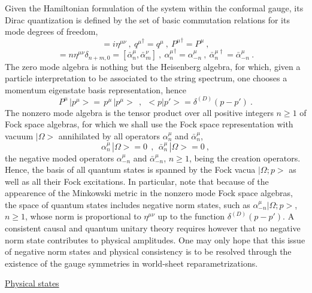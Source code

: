 \documentclass[a4paper,11pt]{article}
\begin{document}
Given the Hamiltonian formulation of the system within the conformal
gauge, its Dirac quantization is defined by the set of basic commutation
relations for its mode degrees of freedom,
\begin{equation}
[\sqrt{2\alpha'}q^\mu,P^\nu]=i\eta^{\mu\nu}\ ,\ {q^\mu}^\dagger=q^\mu\ ,\
{P^\mu}^\dagger=P^\mu\ ,
\end{equation}
\begin{equation}
[\alpha^\mu_n,\alpha^\nu_m]=n\eta^{\mu\nu}\delta_{n+m,0}=
[\bar{\alpha}^\mu_n,\bar{\alpha}^\nu_m]\ ,\ 
{\alpha^\mu_n}^\dagger=\alpha^\mu_{-n}\ ,\
{\bar{\alpha}^{\mu\dagger}_n}=\bar{\alpha}^\mu_{-n}\ .
\end{equation}
The zero mode algebra is nothing but the Heisenberg algebra, for which,
given a particle interpretation to be associated to the string spectrum,
one chooses a momentum eigenstate basis representation, hence
\begin{equation}
P^\mu\,|p^\mu>=\,p^\mu\,|p^\mu>\ \ ,\ \ 
<p|p'>=\delta^{(D)}(p-p')\ .
\end{equation}
The nonzero mode algebra is the tensor product over all positive integers
$n\ge 1$ of Fock space algebras, for which we shall use the Fock space
representation with vacuum $|\Omega>$ annihilated by all operators 
$\alpha^\mu_n$ and $\bar{\alpha}^\mu_n$,
\begin{equation}
\alpha^\mu_n\,|\Omega>=0\ \ ,\ \ 
\bar{\alpha}^\mu_n\,|\Omega>=0\ ,
\end{equation}
the negative moded operators $\alpha^\mu_{-n}$ and $\bar{\alpha}^\mu_{-n}$,
$n\ge 1$, being the creation ope\-ra\-tors. Hence, the basis of all quantum
states is spanned by the Fock vacua $|\Omega;p>$ as well as all their
Fock excitations. In particular, note that because of the appearence of
the Minkowski metric in the nonzero mode Fock space algebras, the space
of quantum states includes negative norm states, such as
$\alpha^\mu_{-n}|\Omega;p>$, $n\ge 1$, whose norm is proportional to
$\eta^{\mu\nu}$ up to the function $\delta^{(D)}(p-p')$. A consistent
causal and quantum unitary theory requires however that no negative norm
state contributes to physical amplitudes. One may only hope that this issue
of negative norm states and physical consistency is to be resolved through
the existence of the gauge symmetries in world-sheet reparametrizations.

\vspace{10pt}

\noindent\underline{Physical states}
\end{document}
